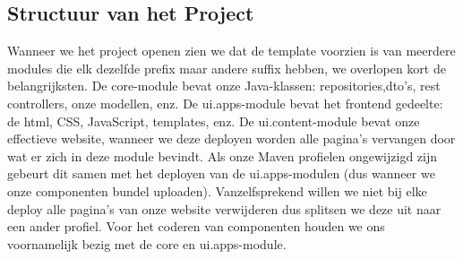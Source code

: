\documentclass{article}
\begin{document}
	\subsection{Structuur van het Project}
	Wanneer we het project openen zien we dat de template voorzien is van meerdere modules die elk dezelfde prefix maar andere suffix hebben, we overlopen kort de belangrijksten. De core-module bevat onze Java-klassen: repositories,dto's, rest controllers, onze modellen, enz. De ui.apps-module bevat het frontend gedeelte: de html, CSS, JavaScript, templates, enz. De ui.content-module bevat onze effectieve website, wanneer we deze deployen worden alle pagina's vervangen door wat er zich in deze module bevindt. Als onze Maven profielen ongewijzigd zijn gebeurt dit samen met het deployen van de ui.apps-modulen (dus wanneer we onze componenten bundel uploaden). Vanzelfsprekend willen we niet bij elke deploy alle pagina's van onze website verwijderen dus splitsen we deze uit naar een ander profiel. Voor het coderen van componenten houden we ons voornamelijk bezig met de core en ui.apps-module.
\end{document}
